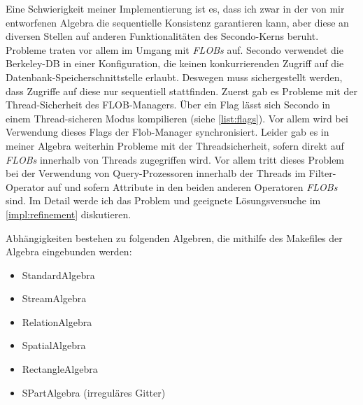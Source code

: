 \documentclass[a4paper,12pt,twoside]{article}
\newcommand{\Fb}[1]{\textit{#1}} %
\begin{document}
Eine Schwierigkeit meiner Implementierung ist es, dass ich zwar in der von mir entworfenen Algebra die sequentielle Konsistenz garantieren kann, aber diese an diversen Stellen auf anderen Funktionalitäten des Secondo-Kerns beruht. Probleme traten vor allem im Umgang mit \Fb{FLOBs} auf. Secondo verwendet die Berkeley-DB in einer Konfiguration, die keinen konkurrierenden Zugriff auf die Datenbank-Speicherschnittstelle erlaubt. Deswegen muss sichergestellt werden, dass Zugriffe auf diese nur sequentiell stattfinden. Zuerst gab es Probleme mit der Thread-Sicherheit des FLOB-Managers. Über ein Flag lässt sich Secondo in einem Thread-sicheren Modus kompilieren (siehe \autoref{list:flags}). Vor allem wird bei Verwendung dieses Flags der Flob-Manager synchronisiert. Leider gab es in meiner Algebra weiterhin Probleme mit der Threadsicherheit, sofern direkt auf \Fb{FLOBs} innerhalb von Threads zugegriffen wird. Vor allem tritt dieses Problem bei der Verwendung von Query-Prozessoren innerhalb der Threads im Filter-Operator auf und sofern Attribute in den beiden anderen Operatoren \Fb{FLOBs} sind. Im Detail werde ich das Problem und geeignete Lösungsversuche im \autoref{impl:refinement} diskutieren.

Abhängigkeiten bestehen zu folgenden Algebren, die mithilfe des Makefiles der Algebra eingebunden werden:

\begin{itemize}
	\item StandardAlgebra
	\item StreamAlgebra
	\item RelationAlgebra
	\item SpatialAlgebra
	\item RectangleAlgebra
	\item SPartAlgebra (irreguläres Gitter)
\end{itemize}
\end{document}
